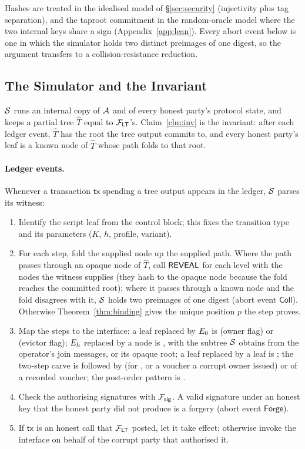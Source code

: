 Hashes are treated in the idealised model of \S\ref{sec:security}
(injectivity plus tag separation), and the taproot commitment in the
random-oracle model where the two internal keys share a sign
(Appendix~\ref{app:lean}). Every abort event below is one in which the
simulator holds two distinct preimages of one digest, so the argument
transfers to a collision-resistance reduction.

\subsection{The Simulator and the Invariant}

$\mathcal{S}$ runs an internal copy of $\mathcal{A}$ and of every honest party's
protocol state, and keeps a partial tree $\hat T$ equal to $\mathcal{F}_{\mathsf{LT}}$'s.
Claim~\ref{clm:inv} is the invariant: after each ledger event,
$\hat T$ has the root the tree output commits to, and every honest
party's leaf is a known node of $\hat T$ whose path folds to that root.

\paragraph{Ledger events.} Whenever a transaction $\mathsf{tx}$ spending a
tree output appears in the ledger, $\mathcal{S}$ parses its witness:

\begin{enumerate}
\item Identify the script leaf from the control block; this fixes the
  transition type and its parameters ($K$, $h$, profile, variant).
\item For each step, fold the supplied node up the supplied path. Where
  the path passes through an opaque node of $\hat T$, call
  $\mathsf{REVEAL}$ for each level with the nodes the witness supplies
  (they hash to the opaque node because the fold reaches the committed
  root); where it passes through a known node and the fold disagrees with
  it, $\mathcal{S}$ holds two preimages of one digest (abort event
  $\mathsf{Coll}$). Otherwise Theorem~\ref{thm:binding} gives the unique
  position $p$ the step proves.
\item Map the steps to the interface: a leaf replaced by $E_0$ is
   (owner flag) or  (evictor flag); $E_h$
  replaced by a node is , with the subtree $\mathcal{S}$ obtains from
  the operator's join messages, or its opaque root; a leaf replaced by a
  leaf is ; the two-step carve is  followed by
   (for , or a voucher a corrupt owner issued) or
   of a recorded voucher; the post-order pattern is
  .
\item Check the authorising signatures with $\mathcal{F}_{\mathsf{sig}}$. A valid signature
  under an honest key that the honest party did not produce is a forgery
  (abort event $\mathsf{Forge}$).
\item If $\mathsf{tx}$ is an honest call that $\mathcal{F}_{\mathsf{LT}}$ posted, let it take
  effect; otherwise invoke the interface on behalf of the corrupt party
  that authorised it.
\end{enumerate}

